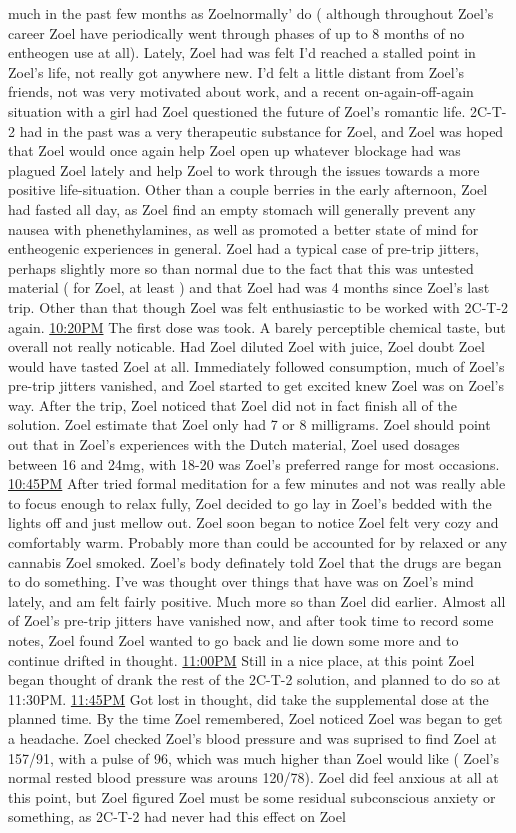 \documentclass[12pt]{book}
\begin{document}
much in the past few months as Zoelnormally' do ( although throughout Zoel's career Zoel have periodically went through phases of up to 8 months of no entheogen use at all). Lately, Zoel had was felt I'd reached a stalled point in Zoel's life, not really got anywhere new. I'd felt a little distant from Zoel's friends, not was very motivated about work, and a recent on-again-off-again situation with a girl had Zoel questioned the future of Zoel's romantic life. 2C-T-2 had in the past was a very therapeutic substance for Zoel, and Zoel was hoped that Zoel would once again help Zoel open up whatever blockage had was plagued Zoel lately and help Zoel to work through the issues towards a more positive life-situation. Other than a couple berries in the early afternoon, Zoel had fasted all day, as Zoel find an empty stomach will generally prevent any nausea with phenethylamines, as well as promoted a better state of mind for entheogenic experiences in general. Zoel had a typical case of pre-trip jitters, perhaps slightly more so than normal due to the fact that this was untested material ( for Zoel, at least ) and that Zoel had was 4 months since Zoel's last trip. Other than that though Zoel was felt enthusiastic to be worked with 2C-T-2 again. \underline{10:20PM} The first dose was took. A barely perceptible chemical taste, but overall not really noticable. Had Zoel diluted Zoel with juice, Zoel doubt Zoel would have tasted Zoel at all. Immediately followed consumption, much of Zoel's pre-trip jitters vanished, and Zoel started to get excited knew Zoel was on Zoel's way. After the trip, Zoel noticed that Zoel did not in fact finish all of the solution. Zoel estimate that Zoel only had 7 or 8 milligrams. Zoel should point out that in Zoel's experiences with the Dutch material, Zoel used dosages between 16 and 24mg, with 18-20 was Zoel's preferred range for most occasions. \underline{10:45PM} After tried formal meditation for a few minutes and not was really able to focus enough to relax fully, Zoel decided to go lay in Zoel's bedded with the lights off and just mellow out. Zoel soon began to notice Zoel felt very cozy and comfortably warm. Probably more than could be accounted for by relaxed or any cannabis Zoel smoked. Zoel's body definately told Zoel that the drugs are began to do something. I've was thought over things that have was on Zoel's mind lately, and am felt fairly positive. Much more so than Zoel did earlier. Almost all of Zoel's pre-trip jitters have vanished now, and after took time to record some notes, Zoel found Zoel wanted to go back and lie down some more and to continue drifted in thought. \underline{11:00PM} Still in a nice place, at this point Zoel began thought of drank the rest of the 2C-T-2 solution, and planned to do so at 11:30PM. \underline{11:45PM} Got lost in thought, did take the supplemental dose at the planned time. By the time Zoel remembered, Zoel noticed Zoel was began to get a headache. Zoel checked Zoel's blood pressure and was suprised to find Zoel at 157/91, with a pulse of 96, which was much higher than Zoel would like ( Zoel's normal rested blood pressure was arouns 120/78). Zoel did feel anxious at all at this point, but Zoel figured Zoel must be some residual subconscious anxiety or something, as 2C-T-2 had never had this effect on Zoel 
\end{document}
